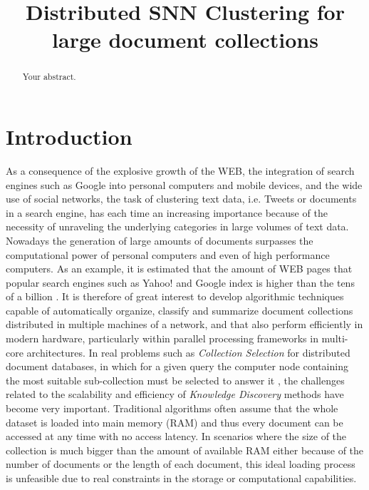 \documentclass[a4paper]{article}
\title{Distributed SNN Clustering for large document collections}
\begin{document}
\maketitle

\begin{abstract}
Your abstract.
\end{abstract}

\section{Introduction}
As a consequence of the explosive growth of the WEB, the integration of search engines such as Google into personal computers and mobile devices, and the wide use of social networks, the task of clustering text data, i.e. Tweets or documents in a search engine, has each time an increasing importance because of the necessity of unraveling the underlying categories in large volumes of text data. Nowadays the generation of large amounts of documents surpasses the computational power of personal computers and even of high performance computers.
As an example, it is estimated that the amount of WEB pages that popular search engines such as Yahoo! and Google index is higher than the tens of a billion \cite{www}.
It is therefore of great interest to develop algorithmic techniques capable of automatically organize, classify and summarize document collections distributed in multiple machines of a network, and that also perform efficiently in modern hardware, particularly within parallel processing frameworks in multi-core architectures. In real problems such as \textit{Collection Selection} for distributed document databases, in which for a given query the computer node containing the most suitable sub-collection must be selected to answer it \cite{CM13}, the challenges related to the scalability and efficiency of \textit{Knowledge Discovery} methods have become very important. Traditional algorithms often assume that the whole dataset is loaded into main memory (RAM) and thus every document can be accessed at any time with no access latency. In scenarios where the size of the collection is much bigger than the amount of available RAM either because of the number of documents or the length of each document, this ideal loading process is unfeasible due to real constraints in the storage or computational capabilities.
\end{document}
